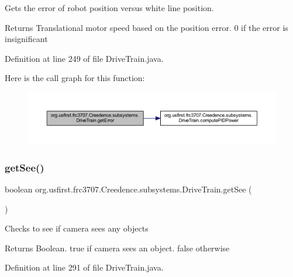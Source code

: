 Gets the error of robot position versus white line position.

\begin{DoxyReturn}{Returns}
Translational motor speed based on the position error. 0 if the error is insignificant 
\end{DoxyReturn}


Definition at line 249 of file Drive\+Train.\+java.

Here is the call graph for this function\+:
\nopagebreak
\begin{figure}[H]
\begin{center}
\leavevmode
\includegraphics[width=350pt]{classorg_1_1usfirst_1_1frc3707_1_1_creedence_1_1subsystems_1_1_drive_train_a0d86aea6052e1c19c0a7c3c9f263573b_cgraph}
\end{center}
\end{figure}
\mbox{\label{classorg_1_1usfirst_1_1frc3707_1_1_creedence_1_1subsystems_1_1_drive_train_ae6525c4274d4545ce25525643e3cfd89}} 
\subsubsection{\texorpdfstring{getSee()}{getSee()}}
{\footnotesize\ttfamily boolean org.\+usfirst.\+frc3707.\+Creedence.\+subsystems.\+Drive\+Train.\+get\+See (\begin{DoxyParamCaption}{ }\end{DoxyParamCaption})}

Checks to see if camera sees any objects

\begin{DoxyReturn}{Returns}
Boolean. true if camera sees an object. false otherwise 
\end{DoxyReturn}


Definition at line 291 of file Drive\+Train.\+java.

\mbox{\label{classorg_1_1usfirst_1_1frc3707_1_1_creedence_1_1subsystems_1_1_drive_train_acd013f12431a4d3b05e36e35a966e244}} 
